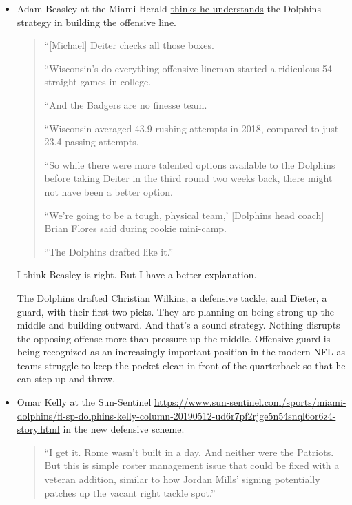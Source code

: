 \documentclass[11pt]{article}
\begin{document}
\begin{itemize}
\item Adam Beasley at the Miami Herald \href{https://www.miamiherald.com/sports/nfl/miami-dolphins/article230302419.html}{thinks he understands} the Dolphins strategy in building the offensive line. 

\begin{quote}
``[Michael] Deiter checks all those boxes.

``Wisconsin’s do-everything offensive lineman started a ridiculous 54 straight games in college.

``And the Badgers are no finesse team.

``Wisconsin averaged 43.9 rushing attempts in 2018, compared to just 23.4 passing attempts.

``So while there were more talented options available to the Dolphins before taking Deiter in the third round two weeks back, there might not have been a better option.

``We’re going to be a tough, physical team,' [Dolphins head coach] Brian Flores said during rookie mini-camp.

``The Dolphins drafted like it.''
\end{quote}

I think Beasley is right.  But I have a better explanation.

The Dolphins drafted Christian Wilkins, a defensive tackle, and Dieter, a guard, with their first two picks.  They are planning on being strong up the middle and building outward.  And that's a sound strategy.  Nothing disrupts the opposing offense more than pressure up the middle.  Offensive guard is being recognized as an increasingly important position in the modern NFL as teams struggle to keep the pocket clean in front of the quarterback so that he can step up and throw.

\item Omar Kelly at the Sun-Sentinel \href{points out that the Dolphins are deficient on the ends}{https://www.sun-sentinel.com/sports/miami-dolphins/fl-sp-dolphins-kelly-column-20190512-ud6r7pf2rjge5n54snql6or6z4-story.html} in the new defensive scheme.

\begin{quote}
  ``I get it. Rome wasn’t built in a day. And neither were the Patriots. But this is simple roster management issue that could be fixed with a veteran addition, similar to how Jordan Mills’ signing potentially patches up the vacant right tackle spot.''
\end{quote}


\end{itemize}
\end{document}
